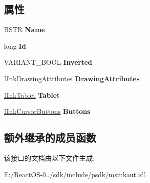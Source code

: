 \subsection*{属性}
\begin{DoxyCompactItemize}
\item 
\mbox{\label{interface_m_s_i_n_k_a_u_t_lib_1_1_i_ink_cursor_a08ca9194e905186e92682b41ba9f97c7}} 
B\+S\+TR {\bfseries Name}
\item 
\mbox{\label{interface_m_s_i_n_k_a_u_t_lib_1_1_i_ink_cursor_ad0a9b9f16e5d43235374a49391f456ce}} 
long {\bfseries Id}
\item 
\mbox{\label{interface_m_s_i_n_k_a_u_t_lib_1_1_i_ink_cursor_a925fc45b9a919e4ec146e31549786e03}} 
V\+A\+R\+I\+A\+N\+T\+\_\+\+B\+O\+OL {\bfseries Inverted}
\item 
\mbox{\label{interface_m_s_i_n_k_a_u_t_lib_1_1_i_ink_cursor_a50a7addd252a134e443831448f8c78e1}} 
\hyperlink{interface_m_s_i_n_k_a_u_t_lib_1_1_i_ink_drawing_attributes}{I\+Ink\+Drawing\+Attributes} {\bfseries Drawing\+Attributes}
\item 
\mbox{\label{interface_m_s_i_n_k_a_u_t_lib_1_1_i_ink_cursor_a62bbcecfb28e461c37ef9d483058d962}} 
\hyperlink{interface_m_s_i_n_k_a_u_t_lib_1_1_i_ink_tablet}{I\+Ink\+Tablet} {\bfseries Tablet}
\item 
\mbox{\label{interface_m_s_i_n_k_a_u_t_lib_1_1_i_ink_cursor_a499623d857cec11bdbe8ad383636446f}} 
\hyperlink{interface_m_s_i_n_k_a_u_t_lib_1_1_i_ink_cursor_buttons}{I\+Ink\+Cursor\+Buttons} {\bfseries Buttons}
\end{DoxyCompactItemize}
\subsection*{额外继承的成员函数}


该接口的文档由以下文件生成\+:\begin{DoxyCompactItemize}
\item 
E\+:/\+React\+O\+S-\/0../sdk/include/psdk/msinkaut.\+idl\end{DoxyCompactItemize}
